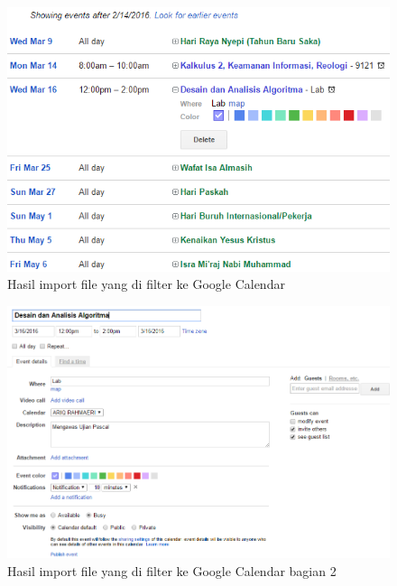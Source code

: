 			\begin{figure}[H]
			\centering
			\includegraphics[scale=0.7]{Gambar/hasilGCFilter}
			\caption{Hasil import file yang di filter ke Google Calendar}
			\label{fig:hasilGCFilter}
			\end{figure}
			
			\begin{figure}[H]
			\centering
			\includegraphics[scale=0.6]{Gambar/hasilGCFilter2}
			\caption{Hasil import file yang di filter ke Google Calendar bagian 2 }
			\label{fig:hasilGCFilter2}
			\end{figure}
			
